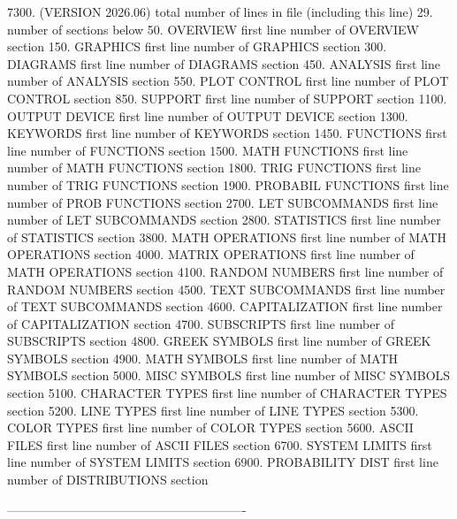 7300.       (VERSION 2026.06)  total number of lines in file (including this line)
29.                          number of     sections below
   50.    OVERVIEW           first line number of OVERVIEW          section
  150.    GRAPHICS           first line number of GRAPHICS          section
  300.    DIAGRAMS           first line number of DIAGRAMS          section
  450.    ANALYSIS           first line number of ANALYSIS          section
  550.    PLOT CONTROL       first line number of PLOT CONTROL      section
  850.    SUPPORT            first line number of SUPPORT           section
 1100.    OUTPUT DEVICE      first line number of OUTPUT DEVICE     section
 1300.    KEYWORDS           first line number of KEYWORDS          section
 1450.    FUNCTIONS          first line number of FUNCTIONS         section
 1500.    MATH FUNCTIONS     first line number of MATH FUNCTIONS    section
 1800.    TRIG FUNCTIONS     first line number of TRIG FUNCTIONS    section
 1900.    PROBABIL FUNCTIONS first line number of PROB FUNCTIONS    section
 2700.    LET SUBCOMMANDS    first line number of LET SUBCOMMANDS   section
 2800.    STATISTICS         first line number of STATISTICS        section
 3800.    MATH OPERATIONS    first line number of MATH OPERATIONS   section
 4000.    MATRIX OPERATIONS  first line number of MATH OPERATIONS   section
 4100.    RANDOM NUMBERS     first line number of RANDOM NUMBERS    section
 4500.    TEXT SUBCOMMANDS   first line number of TEXT SUBCOMMANDS  section
 4600.    CAPITALIZATION     first line number of CAPITALIZATION    section
 4700.    SUBSCRIPTS         first line number of SUBSCRIPTS        section
 4800.    GREEK SYMBOLS      first line number of GREEK SYMBOLS     section
 4900.    MATH SYMBOLS       first line number of MATH SYMBOLS      section
 5000.    MISC SYMBOLS       first line number of MISC SYMBOLS      section
 5100.    CHARACTER TYPES    first line number of CHARACTER TYPES   section
 5200.    LINE TYPES         first line number of LINE TYPES        section
 5300.    COLOR TYPES        first line number of COLOR TYPES       section
 5600.    ASCII FILES        first line number of ASCII FILES       section
 6700.    SYSTEM LIMITS      first line number of SYSTEM LIMITS     section
 6900.    PROBABILITY DIST   first line number of DISTRIBUTIONS     section
 
----------------------------------------------------------
















